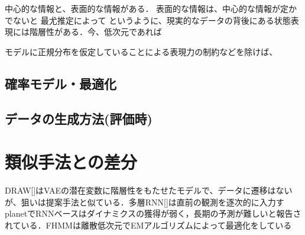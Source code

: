 中心的な情報と、表面的な情報がある．
表面的な情報は、中心的な情報が定かでないと
最尤推定によって
というように、現実的なデータの背後にある状態表現には階層性がある．今、低次元であれば

モデルに正規分布を仮定していることによる表現力の制約などを除けば、

\subsection{確率モデル・最適化}
\subsection{データの生成方法(評価時)}
\section{類似手法との差分}
DRAW[]はVAEの潜在変数に階層性をもたせたモデルで、データに遷移はないが、狙いは提案手法と似ている．多層RNN[]は直前の観測を逐次的に入力すplanetでRNNベースはダイナミクスの獲得が弱く，長期の予測が難しいと報告されている．FHMMは離散低次元でEMアルゴリズムによって最適化をしている


